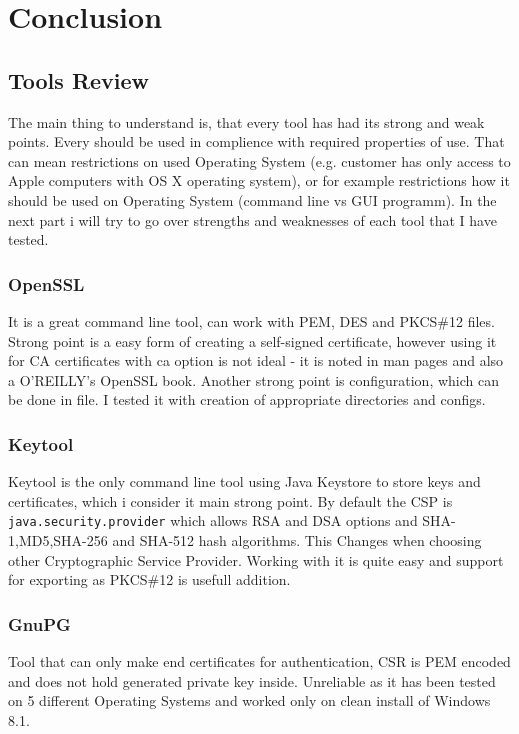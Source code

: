 \documentclass[10pt, a4paper]{report}
\begin{document}
{\part{Conclusion}

\chapter{Tools Review}

The main thing to understand is, that every tool has had its strong and weak points. Every should be used in complience with required properties of use. That can mean restrictions on used Operating System (e.g. customer has only access to Apple computers with OS X operating system), or for example restrictions how it should be used on Operating System (command line vs GUI programm). In the next part i will try to go over strengths and weaknesses of each tool that I have tested.

\section{OpenSSL}
It is a great command line tool, can work with PEM, DES and PKCS\#12 files. Strong point is a easy form of creating a self-signed certificate, however using it for CA certificates with ca option is not ideal - it is noted in man pages and also a O'REILLY's OpenSSL book.
Another strong point is configuration, which can be done in file. I tested it with creation of appropriate directories and configs.

\section{Keytool}
Keytool is the only command line tool using Java Keystore to store keys and certificates, which i consider it main strong point. By default the CSP is \verb+java.security.provider+ which allows RSA and DSA options and SHA-1,MD5,SHA-256 and SHA-512 hash algorithms. This Changes when choosing other Cryptographic Service Provider. Working with it is quite easy and support for exporting as PKCS\#12 is usefull addition.

\section{GnuPG}
Tool that can only make end certificates for authentication, CSR is PEM encoded and does not hold generated private key inside. Unreliable as it has been tested on 5 different Operating Systems and worked only on clean install of Windows 8.1.

}
\end{document}
